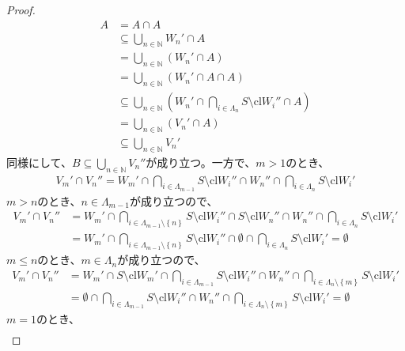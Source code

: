 \documentclass[dvipdfmx]{jsarticle}
\begin{document}
\begin{proof}
\begin{align*}
A &= A \cap A\\
&\subseteq \bigcup_{n \in \mathbb{N}} W_{n}' \cap A\\
&= \bigcup_{n \in \mathbb{N}} \left( W_{n}' \cap A \right)\\
&= \bigcup_{n \in \mathbb{N}} \left( W_{n}' \cap A \cap A \right)\\
&\subseteq \bigcup_{n \in \mathbb{N}} \left( W_{n}' \cap \bigcap_{i \in \varLambda_{n}} {S \setminus {\mathrm{cl}}W_{i}''} \cap A \right)\\
&= \bigcup_{n \in \mathbb{N}} \left( V_{n}' \cap A \right)\\
&\subseteq \bigcup_{n \in \mathbb{N}} V_{n}'
\end{align*}
同様にして、$B \subseteq \bigcup_{n \in \mathbb{N}} V_{n}''$が成り立つ。一方で、$m > 1$のとき、
\begin{align*}
V_{m}' \cap V_{n}'' = W_{m}' \cap \bigcap_{i \in \varLambda_{m - 1}} {S \setminus {\mathrm{cl}}W_{i}''} \cap W_{n}'' \cap \bigcap_{i \in \varLambda_{n}} {S \setminus {\mathrm{cl}}W_{i}'}
\end{align*}
$m > n$のとき、$n \in \varLambda_{m - 1}$が成り立つので、
\begin{align*}
V_{m}' \cap V_{n}'' &= W_{m}' \cap \bigcap_{i \in \varLambda_{m - 1} \setminus \left\{ n \right\}} {S \setminus {\mathrm{cl}}W_{i}''} \cap S \setminus {\mathrm{cl}}W_{n}'' \cap W_{n}'' \cap \bigcap_{i \in \varLambda_{n}} {S \setminus {\mathrm{cl}}W_{i}'}\\
&= W_{m}' \cap \bigcap_{i \in \varLambda_{m - 1} \setminus \left\{ n \right\}} {S \setminus {\mathrm{cl}}W_{i}''} \cap \emptyset \cap \bigcap_{i \in \varLambda_{n}} {S \setminus {\mathrm{cl}}W_{i}'} = \emptyset
\end{align*}
$m \leq n$のとき、$m \in \varLambda_{n}$が成り立つので、
\begin{align*}
V_{m}' \cap V_{n}'' &= W_{m}' \cap S \setminus {\mathrm{cl}}W_{m}' \cap \bigcap_{i \in \varLambda_{m - 1}} {S \setminus {\mathrm{cl}}W_{i}''} \cap W_{n}'' \cap \bigcap_{i \in \varLambda_{n} \setminus \left\{ m \right\}} {S \setminus {\mathrm{cl}}W_{i}'}\\
&= \emptyset \cap \bigcap_{i \in \varLambda_{m - 1}} {S \setminus {\mathrm{cl}}W_{i}''} \cap W_{n}'' \cap \bigcap_{i \in \varLambda_{n} \setminus \left\{ m \right\}} {S \setminus {\mathrm{cl}}W_{i}'} = \emptyset
\end{align*}
$m = 1$のとき、
\begin{align*}

\end{align*}
\end{proof}
\end{document}

